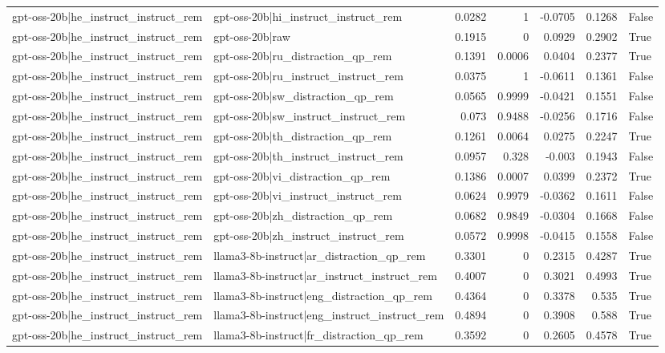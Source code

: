 \begin{table}
\begin{tabular}{l l r r r r l}
gpt-oss-20b|he_instruct_instruct_rem & gpt-oss-20b|hi_instruct_instruct_rem & 0.0282 & 1 & -0.0705 & 0.1268 & False \\
gpt-oss-20b|he_instruct_instruct_rem & gpt-oss-20b|raw & 0.1915 & 0 & 0.0929 & 0.2902 & True \\
gpt-oss-20b|he_instruct_instruct_rem & gpt-oss-20b|ru_distraction_qp_rem & 0.1391 & 0.0006 & 0.0404 & 0.2377 & True \\
gpt-oss-20b|he_instruct_instruct_rem & gpt-oss-20b|ru_instruct_instruct_rem & 0.0375 & 1 & -0.0611 & 0.1361 & False \\
gpt-oss-20b|he_instruct_instruct_rem & gpt-oss-20b|sw_distraction_qp_rem & 0.0565 & 0.9999 & -0.0421 & 0.1551 & False \\
gpt-oss-20b|he_instruct_instruct_rem & gpt-oss-20b|sw_instruct_instruct_rem & 0.073 & 0.9488 & -0.0256 & 0.1716 & False \\
gpt-oss-20b|he_instruct_instruct_rem & gpt-oss-20b|th_distraction_qp_rem & 0.1261 & 0.0064 & 0.0275 & 0.2247 & True \\
gpt-oss-20b|he_instruct_instruct_rem & gpt-oss-20b|th_instruct_instruct_rem & 0.0957 & 0.328 & -0.003 & 0.1943 & False \\
gpt-oss-20b|he_instruct_instruct_rem & gpt-oss-20b|vi_distraction_qp_rem & 0.1386 & 0.0007 & 0.0399 & 0.2372 & True \\
gpt-oss-20b|he_instruct_instruct_rem & gpt-oss-20b|vi_instruct_instruct_rem & 0.0624 & 0.9979 & -0.0362 & 0.1611 & False \\
gpt-oss-20b|he_instruct_instruct_rem & gpt-oss-20b|zh_distraction_qp_rem & 0.0682 & 0.9849 & -0.0304 & 0.1668 & False \\
gpt-oss-20b|he_instruct_instruct_rem & gpt-oss-20b|zh_instruct_instruct_rem & 0.0572 & 0.9998 & -0.0415 & 0.1558 & False \\
gpt-oss-20b|he_instruct_instruct_rem & llama3-8b-instruct|ar_distraction_qp_rem & 0.3301 & 0 & 0.2315 & 0.4287 & True \\
gpt-oss-20b|he_instruct_instruct_rem & llama3-8b-instruct|ar_instruct_instruct_rem & 0.4007 & 0 & 0.3021 & 0.4993 & True \\
gpt-oss-20b|he_instruct_instruct_rem & llama3-8b-instruct|eng_distraction_qp_rem & 0.4364 & 0 & 0.3378 & 0.535 & True \\
gpt-oss-20b|he_instruct_instruct_rem & llama3-8b-instruct|eng_instruct_instruct_rem & 0.4894 & 0 & 0.3908 & 0.588 & True \\
gpt-oss-20b|he_instruct_instruct_rem & llama3-8b-instruct|fr_distraction_qp_rem & 0.3592 & 0 & 0.2605 & 0.4578 & True \\

\end{tabular}
\end{table}
